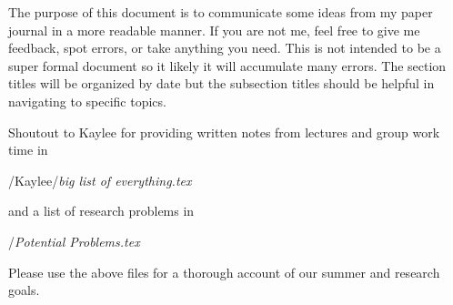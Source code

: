 The purpose of this document is to communicate some ideas from my paper journal in a more readable manner. If you are not me, feel free to give me feedback, spot errors, or take anything you need. This is not intended to be a super formal document so it likely it will accumulate many errors. The section titles will be organized by date but the subsection titles should be helpful in navigating to specific topics.

Shoutout to Kaylee for providing written notes from lectures and group work time in \begin{center} /Kaylee/\textit{big list of everything.tex}\end{center} and a list of research problems in \begin{center} /\textit{Potential Problems.tex}\end{center} Please use the above files for a thorough account of our summer and research goals.